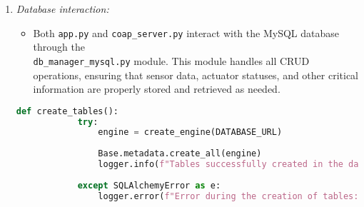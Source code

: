\begin{enumerate}
    \item \textit{Database interaction:}
          \begin{itemize}
              \item Both \texttt{app.py} and \texttt{coap\_server.py} interact with the MySQL database through the\\
                    \texttt{db\_manager\_mysql.py} module. This module handles all CRUD operations, ensuring that sensor data, actuator statuses, and other critical information are properly stored and retrieved as needed.
          \end{itemize}
          \begin{lstlisting}[language=Python]
        def create_tables():
            try:
                engine = create_engine(DATABASE_URL)
        
                Base.metadata.create_all(engine)
                logger.info(f"Tables successfully created in the database '{engine.url.database}'.")
        
            except SQLAlchemyError as e:
                logger.error(f"Error during the creation of tables: {str(e)}")
        \end{lstlisting}
\end{enumerate}

